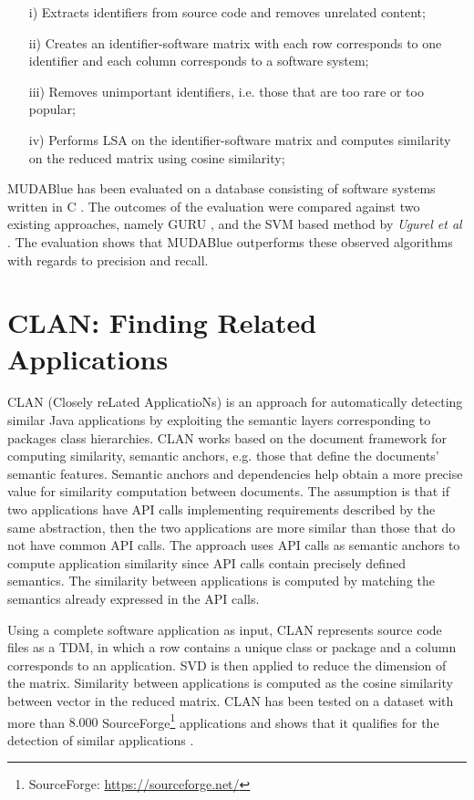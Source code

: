 \begin{itemize}
	
	\item[i)] Extracts identifiers from source code and removes unrelated content;
	\item[ii)] Creates an identifier-software matrix with each row corresponds to one identifier and each column corresponds to a software system;%
	\item[iii)] Removes unimportant identifiers, i.e. those that are too rare or too popular;
	\item[iv)] Performs LSA on the identifier-software matrix and computes similarity on the reduced matrix using cosine similarity; 
\end{itemize}

MUDABlue has been evaluated on a database consisting of software systems written in C \cite{10.1109/APSEC.2004.69}. The outcomes of the evaluation were compared against two existing approaches, namely GURU \cite{Maarek:1991:IRA:126244.126254}, and the SVM based method by \emph{Ugurel et al} \cite{Ugurel:2002:WCA:775047.775141}. The evaluation shows that MUDABlue outperforms these observed algorithms with regards to precision and recall.


\section{CLAN: Finding Related Applications}\label{sec:clan}

CLAN (Closely reLated ApplicatioNs) \cite{McMillan:2012:DSS:2337223.2337267} is an approach for automatically detecting similar Java applications by exploiting the semantic layers corresponding to packages class hierarchies. CLAN works based on the document framework for computing similarity, semantic anchors, e.g. those that define the documents' semantic features. Semantic anchors and dependencies help obtain a more precise value for similarity computation between documents. The assumption is that if two applications have API calls implementing requirements described by the same abstraction, then the two applications are more similar than those that do not have common API calls. The approach uses API calls as semantic anchors to compute application similarity since API calls contain precisely defined semantics. The similarity between applications is computed by matching the semantics already expressed in the API calls.

Using a complete software application as input, CLAN represents source code files as a TDM, in which a row contains a unique class or package and a column corresponds to an application. SVD is then applied to reduce the dimension of the matrix. Similarity between applications is computed as the cosine similarity between vector in the reduced matrix. CLAN has been tested on a dataset with more than $8.000$ SourceForge\footnote{SourceForge: \url{https://sourceforge.net/}} applications and shows that it qualifies for the detection of similar applications \cite{McMillan:2012:DSS:2337223.2337267}.

